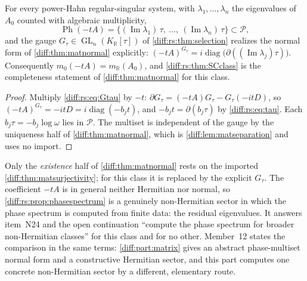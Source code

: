 \documentclass[11pt,letterpaper]{article}
\numberwithin{equation}{section}
\theoremstyle{definition}
\theoremstyle{remark}
\newcommand{\R}{\mathbb R}
\newcommand{\der}{\partial}
\newcommand{\Pcl}{\mathcal P}
\newcommand{\Imm}{\operatorname{Im}}
\newcommand{\GL}{\operatorname{GL}}
\newcommand{\Ph}{\operatorname{Ph}}
\newcommand{\KR}{K_{\R}}
\begin{document}
\begin{proposition}
\label{diff:rs:prop:phasespectrum}
For every power-Hahn regular-singular system, with $\lambda_{1},\dots,\lambda_{n}$
the eigenvalues of $A_{0}$ counted with algebraic multiplicity,
\begin{equation}\label{diff:rs:eq:phasespectrum}
 \Ph(-tA)=\bigl\{(\Imm\lambda_{1})\,\tau,\ \dots,\ (\Imm\lambda_{n})\,\tau\bigr\}
 \subset\Pcl,
\end{equation}
and the gauge $G_{\tau}\in\GL_{n}(\KR[\tau])$ of \cref{diff:rs:thm:selection}
realizes the normal form of \cref{diff:thm:matnormal} explicitly:
$(-tA)^{G_{\tau}}=i\operatorname{diag}\bigl(\der((\Imm\lambda_{j})\tau)\bigr)$.
Consequently $m_{0}(-tA)=m_{\R}(A_{0})$, and \cref{diff:rs:thm:SCclass} is the
completeness statement of \cref{diff:thm:matnormal} for this class.
\end{proposition}
\begin{proof}
Multiply \cref{diff:rs:eq:Gtau} by $-t$: $\der G_{\tau}=(-tA)G_{\tau}-G_{\tau}(-itD)$,
so $(-tA)^{G_{\tau}}=-itD=i\operatorname{diag}(-b_{j}t)$, and
$-b_{j}t=\der(b_{j}\tau)$ by \cref{diff:rs:eq:tau}. Each $b_{j}\tau=-b_{j}\log\omega$
lies in $\Pcl$. The multiset is independent of the gauge by the uniqueness half
of \cref{diff:thm:matnormal}, which is \cref{diff:lem:matseparation} and uses no
import.
\end{proof}

Only the \emph{existence} half of \cref{diff:thm:matnormal} rests on the
imported \cref{diff:thm:matsurjectivity}; for this class it is replaced by the
explicit $G_{\tau}$. The coefficient $-tA$ is in general neither Hermitian nor
normal, so \cref{diff:rs:prop:phasespectrum} is a genuinely non-Hermitian sector
in which the phase spectrum is computed from finite data: the residual
eigenvalues. It answers item~N24 and the open continuation ``compute the phase
spectrum for broader non-Hermitian classes'' for this class and for no other.
Member~12 states the comparison in the same terms: \cref{diff:part:matrix}
gives an abstract phase-multiset normal form and a constructive Hermitian
sector, and this part computes one concrete non-Hermitian sector by a
different, elementary route.
\end{document}
